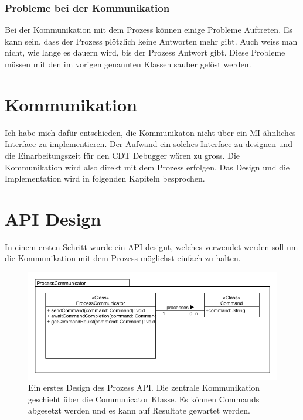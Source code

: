 \subsubsection{Probleme bei der Kommunikation}

Bei der Kommunikation mit dem Prozess können einige Probleme Auftreten. Es kann sein, dass der Prozess plötzlich keine Antworten mehr gibt. Auch weiss man nicht, wie lange es dauern wird, bis der Prozess Antwort gibt. Diese Probleme müssen mit den im vorigen genannten Klassen sauber gelöst werden.

\section{Kommunikation}

Ich habe mich dafür entschieden, die Kommunikaton nicht über ein MI ähnliches Interface zu implementieren. Der Aufwand ein solches Interface zu designen und die Einarbeitungszeit für den CDT Debugger wären zu gross. Die Kommunikation wird also direkt mit dem Prozess erfolgen. Das Design und die Implementation wird in folgenden Kapiteln besprochen.


\section{API Design}

In einem ersten Schritt wurde ein API designt, welches verwendet werden soll um die Kommunikation mit dem Prozess möglichst einfach zu halten.

\begin{figure}[H]
	\centering
		\includegraphics[scale=0.5]{forthcommunication/api.png}
		\caption{Ein erstes Design des Prozess API. Die zentrale Kommunikation geschieht über die Communicator Klasse. Es können Commands abgesetzt werden und es kann auf Resultate gewartet werden.}
		\label{fig:extensionpoint}
\end{figure}

